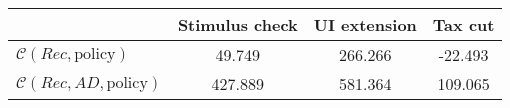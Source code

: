 \begin{tabular}{@{}lccc@{}} 
\toprule 
                          & Stimulus check      & UI extension    & Tax cut    \\  \midrule 
$\mathcal{C}(Rec,\text{policy})$ & 49.749  & 266.266  & -22.493     \\ 
$\mathcal{C}(Rec, AD,\text{policy})$ & 427.889  & 581.364  & 109.065     \\ 
\end{tabular}  
  
